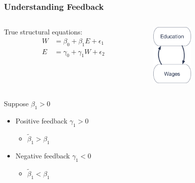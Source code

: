 \documentclass[12pt, block=fill]{beamer}
\begin{document}
\begin{frame}
  \frametitle{Understanding Feedback}
    \begin{columns}
    \begin{column}{0.5\textwidth}
      \center
      True structural equations:
      \begin{align*}
        W &= \beta_0 + \beta_1 E + \epsilon_1\\
        E &= \gamma_0 + \gamma_1 W + \epsilon_2
      \end{align*}
    \end{column}
    \begin{column}{0.5\textwidth} 
      \center
      \includegraphics[height = 3cm]{images/reverse_causality}
    \end{column}
  \end{columns}
  Suppose $\beta_1 > 0$
  
  \begin{itemize}
\item Positive feedback $\gamma_1 > 0$ 
\begin{itemize}
\item $\tilde \beta_1 > \beta_1$
\end{itemize}
\item Negative feedback $\gamma_1 < 0$ 
\begin{itemize}
\item $\tilde \beta_1 < \beta_1$
\end{itemize}
\end{itemize}

\end{frame}
\end{document}
